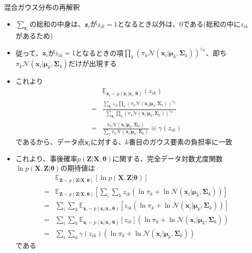 \documentclass[dvipdfmx,notheorems,t]{beamer}
\begin{document}
\begin{frame}{混合ガウス分布の再解釈}
\begin{itemize}
\begin{itemize}
		\item $\displaystyle \sum_{\bm{z}_i}$の総和の中身は、$\bm{z}_i$が$z_{ik} = 1$となるとき以外は、$0$である(総和の中に$z_{ik}$があるため)
		\item 従って、$\bm{z}_i$が$z_{ik} = 1$となるときの項$\prod_k \left( \pi_k \mathcal{N}(\bm{x}_i | \bm{\mu}_k, \bm{\Sigma}_k) \right)^{z_{ik}}$、即ち$\pi_k \mathcal{N}(\bm{x}_i | \bm{\mu}_k, \bm{\Sigma}_k)$だけが出現する
		\newline
		
		\item これより
		\begin{eqnarray}
			&& \mathbb{E}_{\bm{z}_i \sim p(\bm{z}_i | \bm{x}_i, \bm{\theta})}(z_{ik}) \nonumber \\
			&=& \frac{\displaystyle \sum_{\bm{z}_i} z_{ik} \prod_k \left( \pi_k \mathcal{N}(\bm{x}_i | \bm{\mu}_k, \bm{\Sigma}_k) \right)^{z_{ik}}}{\displaystyle \sum_{\bm{z}_i} \prod_k \left( \pi_k \mathcal{N}(\bm{x}_i | \bm{\mu}_k, \bm{\Sigma}_k) \right)^{z_{ik}}} \nonumber \\
			&=& \frac{\pi_k \mathcal{N}(\bm{x}_i | \bm{\mu}_k, \bm{\Sigma}_k)}{\sum_k \pi_k \mathcal{N}(\bm{x}_i | \bm{\mu}_k, \bm{\Sigma}_k)} \equiv \gamma(z_{ik})
		\end{eqnarray}
		であるから、データ点$\bm{x}_i$に対する、$k$番目のガウス要素の\alert{負担率に一致}
		\newline
		
		\item これより、事後確率$p(\bm{Z} | \bm{X}, \bm{\theta})$に関する、完全データ対数尤度関数$\ln p(\bm{X}, \bm{Z} | \bm{\theta})$の期待値は
		\begin{eqnarray}
			&& \mathbb{E}_{\bm{Z} \sim p(\bm{Z} | \bm{X}, \bm{\theta})} \left[ \ln p(\bm{X}, \bm{Z} | \bm{\theta}) \right] \nonumber \\
			&=& \mathbb{E}_{\bm{Z} \sim p(\bm{Z} | \bm{X}, \bm{\theta})} \left[ \sum_i \sum_k z_{ik} \left( \ln \pi_k + \ln \mathcal{N}(\bm{x}_i | \bm{\mu}_k, \bm{\Sigma}_k) \right) \right] \nonumber \\
			&=& \sum_i \sum_k \mathbb{E}_{\bm{z}_i \sim p(\bm{z}_i | \bm{x}_i, \bm{\theta})} \left[ z_{ik} \left( \ln \pi_k + \ln \mathcal{N}(\bm{x}_i | \bm{\mu}_k, \bm{\Sigma}_k) \right) \right] \\
			&=& \sum_i \sum_k \mathbb{E}_{\bm{z}_i \sim p(\bm{z}_i | \bm{x}_i, \bm{\theta})} \left[ z_{ik} \right] \left( \ln \pi_k + \ln \mathcal{N}(\bm{x}_i | \bm{\mu}_k, \bm{\Sigma}_k) \right) \\
			&=& \sum_i \sum_k \gamma(z_{ik}) \left( \ln \pi_k + \ln \mathcal{N}(\bm{x}_i | \bm{\mu}_k, \bm{\Sigma}_k) \right)
		\end{eqnarray}
		である
		\newline
		

\end{itemize}
\end{itemize}
\end{frame}
\end{document}
